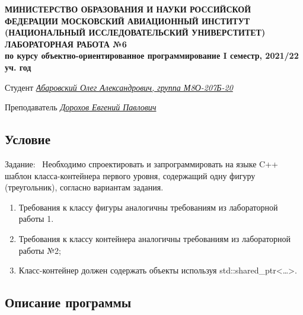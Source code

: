 \documentclass[12pt]{article}
\begin{document}
\begin{titlepage}
\begin{center}
\textbf{МИНИСТЕРСТВО ОБРАЗОВАНИЯ И НАУКИ РОССИЙСКОЙ ФЕДЕРАЦИИ
\medskip
МОСКОВСКИЙ АВИАЦИОННЫЙ ИНСТИТУТ
(НАЦИОНАЛЬНЫЙ ИССЛЕДОВАТЕЛЬСКИЙ УНИВЕРСТИТЕТ)
\vfill\vfill
{\Huge ЛАБОРАТОРНАЯ РАБОТА №6} \\
по курсу объектно-ориентированное программирование
I семестр, 2021/22 уч. год}
\end{center}
\vfill

Студент \uline{\it {Абаровский Олег Александрович, группа М8О-207Б-20}\hfill}

Преподаватель \uline{\it {Дорохов Евгений Павлович}\hfill}

\vfill
\end{titlepage}

\subsection*{Условие}

Задание: \
Необходимо спроектировать и запрограммировать на языке C++ шаблон класса-контейнера
первого уровня, содержащий одну фигуру (треугольник), согласно вариантам задания.
\begin{enumerate}
\item Требования к классу фигуры аналогичны требованиям из лабораторной работы 1.
\item Требования к классу контейнера аналогичны требованиям из лабораторной работы №2;
\item Класс-контейнер должен содержать объекты используя std::shared\_ptr<…>.
\end{enumerate}

\subsection*{Описание программы}
\end{document}
